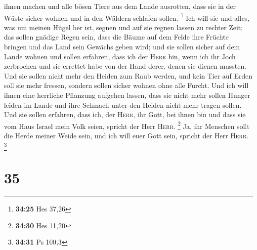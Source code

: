 ihnen machen und alle bösen Tiere aus dem Lande ausrotten, dass sie in
der Wüste sicher wohnen und in den Wäldern schlafen sollen. \footnote{\textbf{34:25}
  Hes 37,26}  Ich will sie und alles, was um meinen Hügel
her ist, segnen und auf sie regnen lassen zu rechter Zeit; das sollen
gnädige Regen sein,  dass die Bäume auf dem Felde ihre
Früchte bringen und das Land sein Gewächs geben wird; und sie sollen
sicher auf dem Lande wohnen und sollen erfahren, dass ich der
\textsc{Herr} bin, wenn ich ihr Joch zerbrochen und sie errettet habe
von der Hand derer, denen sie dienen mussten.  Und sie
sollen nicht mehr den Heiden zum Raub werden, und kein Tier auf Erden
soll sie mehr fressen, sondern sollen sicher wohnen ohne alle Furcht.
 Und ich will ihnen eine herrliche Pflanzung aufgehen
lassen, dass sie nicht mehr sollen Hunger leiden im Lande und ihre
Schmach unter den Heiden nicht mehr tragen sollen.  Und
sie sollen erfahren, dass ich, der \textsc{Herr}, ihr Gott, bei ihnen
bin und dass sie vom Haus Israel mein Volk seien, spricht der Herr
\textsc{Herr}. \footnote{\textbf{34:30} Hes 11,20}  Ja,
ihr Menschen sollt die Herde meiner Weide sein, und ich will euer Gott
sein, spricht der Herr \textsc{Herr}. \footnote{\textbf{34:31} Ps 100,3}

\hypertarget{section-9}{%
\section{35}\label{section-9}}

